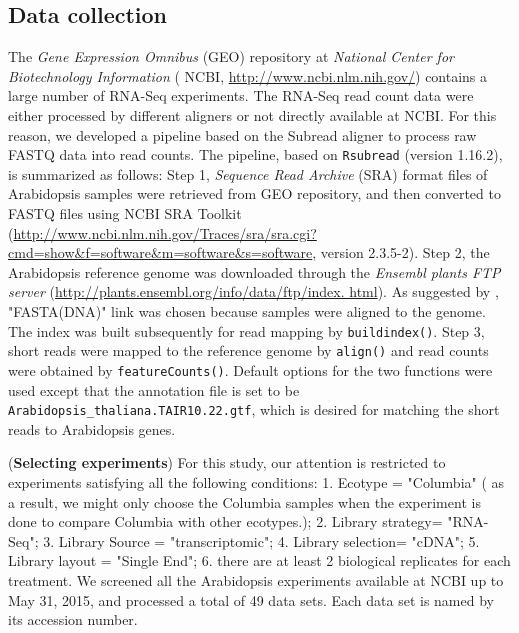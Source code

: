 \documentclass[11pt, a4paper]{article}
\begin{document}
\subsection{Data collection}\label{section:DataCollection}
The \textit{Gene Expression Omnibus} (GEO) repository at \textit{National Center for Biotechnology Information} ( NCBI, \url{http://www.ncbi.nlm.nih.gov/}) contains a large number of RNA-Seq experiments. The RNA-Seq read count data were either processed by different aligners or not directly available at NCBI. For this reason, we developed a pipeline based on the Subread aligner \citep{liao2013subread} to process raw FASTQ data into read counts. The pipeline, based on \verb"Rsubread" (version 1.16.2), is summarized as follows: Step 1, \textit{Sequence Read Archive} (SRA) format files of Arabidopsis samples were retrieved from GEO repository, and then converted to
FASTQ files using NCBI SRA Toolkit (\url{http://www.ncbi.nlm.nih.gov/Traces/sra/sra.cgi?cmd=show&f=software&m=software&s=software}, version 2.3.5-2). Step 2, the Arabidopsis reference genome was downloaded through the\textit{ Ensembl plants FTP server}
(\url{http://plants.ensembl.org/info/data/ftp/index. html}). As suggested by
\cite{anders2013count}, "FASTA(DNA)" link was chosen because samples were aligned 
to the genome. The index was built subsequently for read mapping by \verb|buildindex()|.  Step 3, short reads were mapped to the reference genome by \verb"align()" and read counts
were obtained by \verb"featureCounts()". Default options for the two functions were used except that
the annotation file is set to be \verb"Arabidopsis_thaliana.TAIR10.22.gtf", which is desired for matching the short reads to Arabidopsis genes. %


  (\textbf{Selecting experiments}) For this study, our attention is restricted to experiments satisfying all the following conditions:  1. Ecotype = "Columbia" ( as a result, we might only choose the Columbia samples when the experiment is done to compare Columbia with other ecotypes.); 2. Library strategy= "RNA-Seq"; 3. Library Source = "transcriptomic"; 4. Library selection= "cDNA"; 5. Library layout = "Single End"; 6. there are at least 2 biological replicates for each treatment. We screened all the Arabidopsis experiments available at NCBI up to May 31, 2015, and processed a total of 49 data sets. Each data set is named by its accession number. 
    
\end{document}
